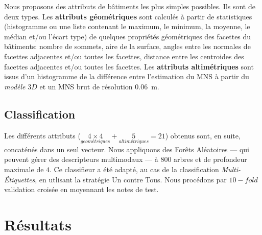\documentclass[a4paper,french]{article}
\begin{document}
    Nous proposons des attributs de bâtiments les plus simples possibles. Ils sont de deux types. Les \textbf{attributs géométriques} sont calculés à partir de statistiques (histogramme ou une liste contenant le maximum, le minimum, la moyenne, le médian et/ou l'écart type) de quelques propriétés géométriques des facettes du bâtiments: nombre de sommets, aire de la surface, angles entre les normales de facettes adjacentes et/ou toutes les facettes, distance entre les centroides des facettes adjacentes et/ou toutes les facettes. Les \textbf{attributs altimétriques} sont issus d'un histogramme de la différence entre l'estimation du MNS à partir du \textit{modèle} $3D$ et un MNS brut de résolution \SI{0,06}{m}.
    \subsection{Classification}

    Les différents attributs ($\underset{geométriques}{4\times4} + \underset{altimétriques}{5} = 21$) obtenus sont, en suite, concaténés dans un seul vecteur. Nous appliquons des Forêts Aléatoires --- qui peuvent gérer des descripteurs multimodaux --- à $800$ arbres et de profondeur maximale de $4$. Ce classifieur a été adapté, au cas de la classification \emph{Multi-\'Etiquettes}, en utlisant la stratégie Un contre Tous. Nous procédons par $10-fold$ validation croisée en moyennant les notes de test.

    \section{Résultats}
\end{document}
